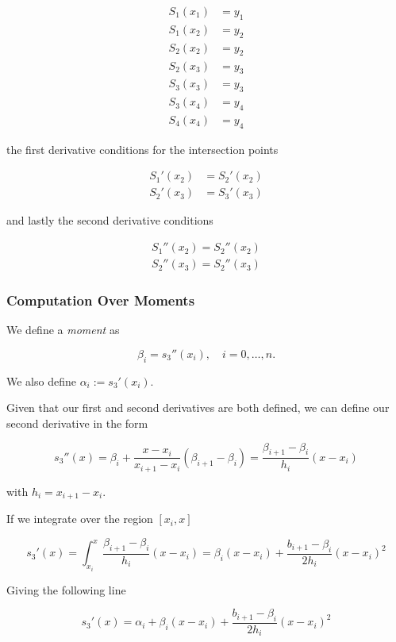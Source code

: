 \begin{align*}
    S_1(x_1) &= y_1 \\   
    S_1(x_2) &= y_2 \\ 
    S_2(x_2) &= y_2 \\  
    S_2(x_3) &= y_3 \\  
    S_3(x_3) &= y_3 \\  
    S_3(x_4) &= y_4 \\  
    S_4(x_4) &= y_4 
\end{align*}

the first derivative conditions for the intersection points

\begin{align*}
    S_1'(x_2) &= S_2'(x_2) \\ 
    S_2'(x_3) &= S_3'(x_3)
\end{align*}

and lastly the second derivative conditions

\begin{align*}
    S_1''(x_2) = S_2''(x_2) \\ 
    S_2''(x_3) = S_2''(x_3)
\end{align*}

\subsubsection{Computation Over Moments}

We define a \emph{moment} as 

\[
    \beta_i = s_3''(x_i), \quad i = 0, \dots, n.
\]

We also define  \(\alpha_i := s_3'(x_i)\). 

Given that our first and second derivatives are both defined, we can define our second derivative in the form 

\[
    s_3''(x) = \beta_i + \frac{x - x_i}{x_{i + 1} - x_i}(\beta_{i + 1} - \beta_i) = \frac{\beta_{i + 1} - \beta_{i}}{h_i}(x - x_i)
\]

with \(h_i = x_{i + 1} - x_i\).

If we integrate over the region \([x_i, x]\)

\[
    s_3'(x) = \int_{x_i}^{x} \frac{\beta_{i + 1} - \beta_{i}}{h_i}(x - x_i) = \beta_i (x - x_i) + \frac{b_{i + 1} - \beta_i}{2h_i} (x - x_i)^2 
\]

Giving the following line

\[
    s_3'(x) = \alpha_i + \beta_i (x - x_i) + \frac{b_{i + 1} - \beta_i}{2h_i} (x - x_i)^2 
\]

